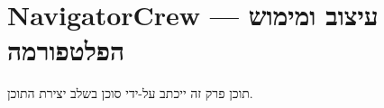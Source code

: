 \section{NavigatorCrew — עיצוב ומימוש הפלטפורמה}
\label{sec:oursystem}

תוכן פרק זה ייכתב על-ידי סוכן  בשלב יצירת התוכן.
